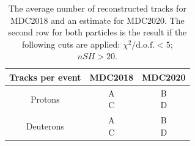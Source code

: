 \documentclass[12pt,a4paper,openright, oneside, titlepage]{book} %
\begin{document}
\begin{table}
\centering
\begin{tabular}{|c|c|c|}
\hline
Tracks per event& MDC2018 & MDC2020 \\
\hline
\hline
Protons& 
\makecell{A \\ C} & 
\makecell{ B \\ D} \\
\hline
Deuterons & 
\makecell{A \\ C} & 
\makecell{ B \\ D} \\
\hline
\end{tabular}
\caption[Educated guess on MDC2020 yields]{The average number of reconstructed tracks for MDC2018 and an estimate for MDC2020.
The second row for both particles is the result if the following cuts are applied: $\chi^2/\textrm{d.o.f.}<5$; $nSH>20$.}
\label{T_syst}
\end{table}

\end{document}
